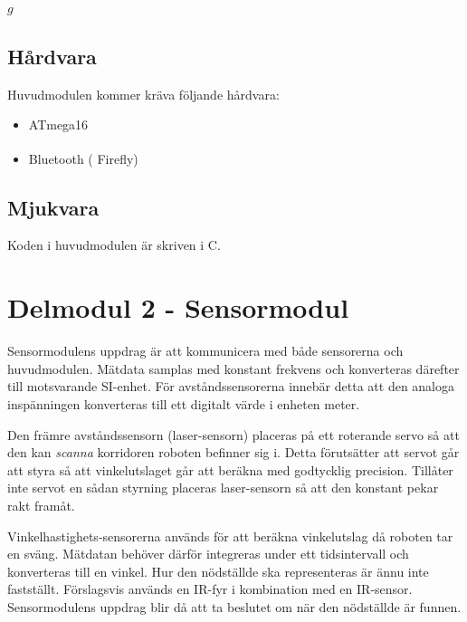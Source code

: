 \documentclass[11pt]{article}
\begin{document}
\begin{flushleft}
\begin{algorithm}[H]
\begin{algorithmic}[1]
			\Return $g$
		\EndFunction
	\end{algorithmic}
\end{algorithm}
  

\subsection{Hårdvara}
Huvudmodulen kommer kräva följande hårdvara:
\begin{itemize}
	\item ATmega16
	\item  Bluetooth\textsuperscript{\circledR} ( Firefly)
\end{itemize}


\subsection{Mjukvara}
Koden i huvudmodulen är skriven i C. 

\pagebreak
\section{Delmodul 2 - Sensormodul}
Sensormodulens uppdrag är att kommunicera med både sensorerna och huvudmodulen. Mätdata samplas med konstant frekvens och konverteras därefter till motsvarande SI-enhet. För avståndssensorerna innebär detta att den analoga inspänningen konverteras till ett digitalt värde i enheten meter.

Den främre avståndssensorn (laser-sensorn) placeras på ett roterande servo så att den kan \emph{scanna} korridoren roboten befinner sig i. Detta förutsätter att servot går att styra så att vinkelutslaget går att beräkna med godtycklig precision. Tillåter inte servot en sådan styrning placeras laser-sensorn så att den konstant pekar rakt framåt.

Vinkelhastighets-sensorerna används för att beräkna vinkelutslag då roboten tar en sväng. Mätdatan behöver därför integreras under ett tidsintervall och konverteras till en vinkel. Hur den nödställde ska representeras är ännu inte fastställt. Förslagsvis används en IR-fyr i kombination med en IR-sensor. Sensormodulens uppdrag blir då att ta beslutet om när den nödställde är funnen.


\end{flushleft}
\end{document}

